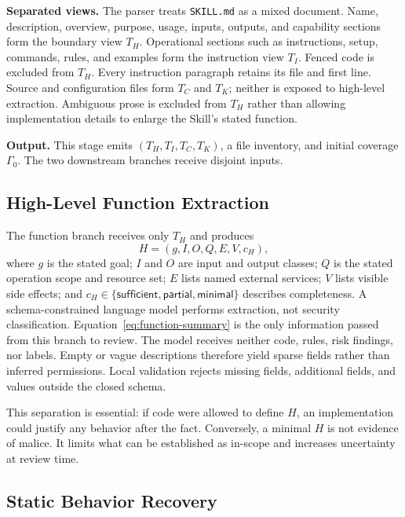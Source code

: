 \textbf{Separated views.} The parser treats \texttt{SKILL.md} as a mixed
document. Name, description, overview, purpose, usage, inputs, outputs, and
capability sections form the boundary view $T_H$. Operational sections such
as instructions, setup, commands, rules, and examples form the instruction
view $T_I$. Fenced code is excluded from $T_H$. Every instruction paragraph
retains its file and first line. Source and configuration files form $T_C$
and $T_K$; neither is exposed to high-level extraction. Ambiguous prose is
excluded from $T_H$ rather than allowing implementation details to enlarge the
Skill's stated function.

\textbf{Output.} This stage emits $(T_H,T_I,T_C,T_K)$, a file inventory, and
initial coverage $\Gamma_0$. The two downstream branches receive disjoint
inputs.

\subsection{High-Level Function Extraction}
\label{sec:function}

The function branch receives only $T_H$ and produces
\begin{equation}
H=(g,I,O,Q,E,V,c_H),
\label{eq:function-summary}
\end{equation}
where $g$ is the stated goal; $I$ and $O$ are input and output classes; $Q$ is
the stated operation scope and resource set; $E$ lists named external
services; $V$ lists visible side effects; and
$c_H\in\{\mathsf{sufficient},\mathsf{partial},\mathsf{minimal}\}$ describes
completeness. A schema-constrained language model performs extraction, not
security classification. Equation~\ref{eq:function-summary} is the only
information passed from this branch to review. The model receives neither
code, rules, risk findings, nor
labels. Empty or vague descriptions therefore yield sparse fields rather than
inferred permissions. Local validation rejects missing fields, additional
fields, and values outside the closed schema.

This separation is essential: if code were allowed to define $H$, an
implementation could justify any behavior after the fact. Conversely, a
minimal $H$ is not evidence of malice. It limits what can be established as
in-scope and increases uncertainty at review time.

\subsection{Static Behavior Recovery}
\label{sec:behavior}

